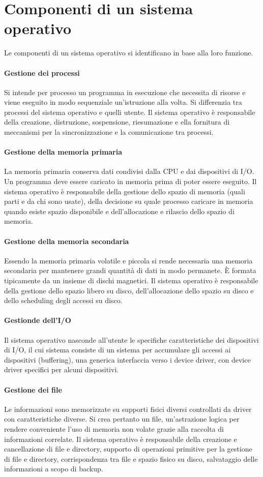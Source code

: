 \chapter{Componenti di un sistema operativo}
Le componenti di un sistema operativo si identificano in base alla loro funzione.
\subsubsection{Gestione dei processi}
Si intende per processo un programma in esecuzione che necessita di risorse e viene eseguito in modo sequenziale un'istruzione alla volta. Si differenzia tra processi del sistema operativo e quelli utente. Il 
sistema operativo \`e responsabile della creazione, distruzione, sospensione, riesumazione e ella fornitura di meccanismi per la sincronizzazione e la comunicazione tra processi. 
\subsubsection{Gestione della memoria primaria}
La memoria primaria conserva dati condivisi dalla CPU e dai dispositivi di I/O. Un programma deve essere caricato in memoria prima di poter essere eseguito. Il sistema operativo \`e responsabile della gestione 
dello spazio di memoria (quali parti e da chi sono usate), della decisione su quale processo caricare in memoria quando esiste spazio disponibile e dell'allocazione e rilascio dello spazio di memoria. 
\subsubsection{Gestione della memoria secondaria}
Essendo la memoria primaria volatile e piccola si rende necessaria una memoria secondaria per mantenere grandi quantit\`a di dati in modo permanete. \`E formata tipicamente da un insieme di dischi 
magnetici. Il sistema operativo \`e responsabile della gestione dello spazio libero su disco, dell'allocazione dello spazio su disco e dello scheduling degli accessi su disco. 
\subsubsection{Gestionde dell'I/O}
Il sistema operativo nasconde all'utente le specifiche caratteristiche dei dispositivi di I/O, il cui sistema consiste di un sistema per accumulare gli accessi ai dispositivi (buffering), una generica interfaccia verso i 
device driver, con device driver specifici per alcuni dispositivi. 
\subsubsection{Gestione dei file}
Le informazioni sono memorizzate su supporti fisici diversi controllati da driver con caratteristiche diverse. Si crea pertanto un file, un'astrazione logica per rendere conveniente l'uso di memoria non volate 
grazie alla raccolta di informazioni correlate. Il sistema operativo \`e responsabile della creazione e cancellazione di file e directory, supporto di operazioni primitive per la gestione di file e directory, 
corrispondenza tra file e spazio fisico su disco, salvataggio delle informazioni a scopo di backup. 
